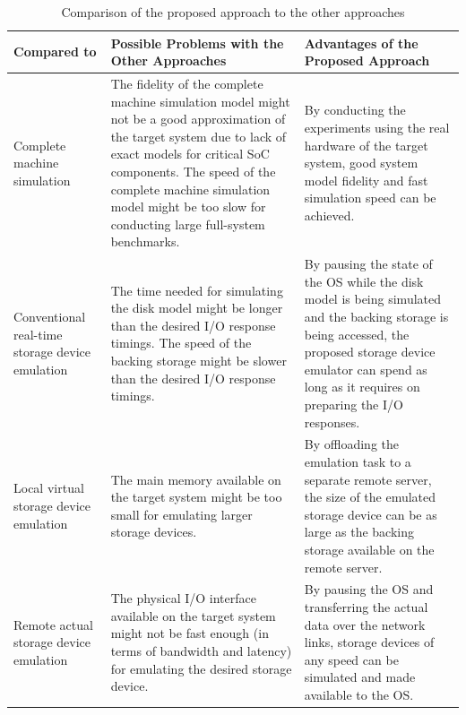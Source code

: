 \begin{table}[htbp]%
	\renewcommand{\arraystretch}{1.3}
	\centering
	\caption{Comparison of the proposed approach to the other approaches}\label{tab:ch6-1}
	\noindent\begin{tabularx}{\textwidth}{|p{2.8cm}|p{5.4cm}|X|}
		\hline
		\centering\bfseries Compared to & \centering\bfseries Possible Problems with the Other Approaches & \centering\bfseries\arraybackslash Advantages of the Proposed Approach \\ \hline
		
		\hyphenpenalty=10000\raggedright Complete machine simulation & The fidelity of the complete machine simulation model might not be a good approximation of the target system due to lack of exact models for critical SoC components. \newline\newline
		The speed of the complete machine simulation model might be too slow for conducting large full-system benchmarks. &
		By conducting the experiments using the real hardware of the target system, good system model fidelity and fast simulation speed can be achieved. \\ \hline
		
		\hyphenpenalty=10000\raggedright Conventional real-time storage device emulation &
		The time needed for simulating the disk model might be longer than the desired I/O response timings. \newline\newline
		The speed of the backing storage might be slower than the desired I/O response timings. &
		By pausing the state of the OS while the disk model is being simulated and the backing storage is being accessed, the proposed storage device emulator can spend as long as it requires on preparing the I/O responses. \\ \hline
		
		\hyphenpenalty=10000\raggedright Local virtual storage device emulation &
		The main memory available on the target system might be too small for emulating larger storage devices. &
		By offloading the emulation task to a separate remote server, the size of the emulated storage device can be as large as the backing storage available on the remote server. \\ \hline
		
		\hyphenpenalty=10000\raggedright Remote actual storage device emulation &
		The physical I/O interface available on the target system might not be fast enough (in terms of bandwidth and latency) for emulating the desired storage device. &
		By pausing the OS and transferring the actual data over the network links, storage devices of any speed can be simulated and made available to the OS. \\ \hline
		\end{tabularx}
\end{table}%

